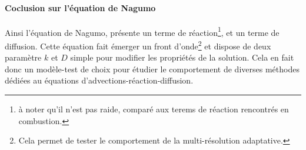 \paragraph{Coclusion sur l'équation de Nagumo}
Ainsi l'équation de Nagumo, présente un terme de réaction\footnote{à noter qu'il n'est pas raide, comparé aux terems de réaction rencontrés en combustion.},
et un terme de diffusion. Cette équation fait émerger un front d'onde\footnote{Cela permet de tester le comportement de la multi-résolution adaptative.} et dispose de deux paramètre $k$ et $D$ simple pour modifier les propriétés de la solution. 
Cela en fait donc un modèle-test de choix pour étudier le comportement de diverses méthodes dédiées au équations d'advections-réaction-diffusion. 